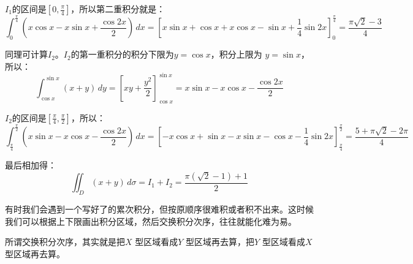 \begin{myexample}
    $I_1$的区间是$[0,\frac{\pi}{4}]$，所以第二重积分就是：
    \[
    \int_0^{\frac{\pi}{4}} (x\cos x - x\sin x + \frac{\cos 2x}{2}) \, dx=[x\sin x + \cos x + x\cos x - \sin x + \frac{1}{4}\sin 2x]_0^{\frac{\pi}{4}}=\frac{\pi\sqrt{2}-3}{4}
    \]

    同理可计算$I_2$。$I_2$的第一重积分的积分下限为$y = \cos x$，积分上限为 $y = \sin x$，所以：
    \[
    \int_{\cos x}^{\sin x} (x+y) \, dy=\left[ xy + \frac{y^2}{2} \right]_{\cos x}^{\sin x}=x\sin x - x\cos x - \frac{\cos 2x}{2}
    \]

    $I_2$的区间是$[\frac{\pi}{4},\frac{\pi}{2}]$，所以：
    \[
    \int_{\frac{\pi}{4}}^{\frac{\pi}{2}} (x\sin x - x\cos x - \frac{\cos 2x}{2}) \, dx=[-x\cos x + \sin x - x\sin x - \cos x - \frac{1}{4}\sin 2x]_{\frac{\pi}{4}}^{\frac{\pi}{2}}=\frac{5+\pi\sqrt{2}-2\pi}{4}
    \]

    最后相加得：
    \[\iint_D (x+y) \, d\sigma = I_1 + I_2 = \frac{\pi(\sqrt{2}-1)+1}{2}\]
\end{myexample}

有时我们会遇到一个写好了的累次积分，但按原顺序很难积或者积不出来。这时候我们可以根据上下限画出积分区域，然后交换积分次序，往往就能化难为易。

所谓交换积分次序，其实就是把$X$ 型区域看成$Y$ 型区域再去算，把$Y$ 型区域看成$X$ 型区域再去算。

